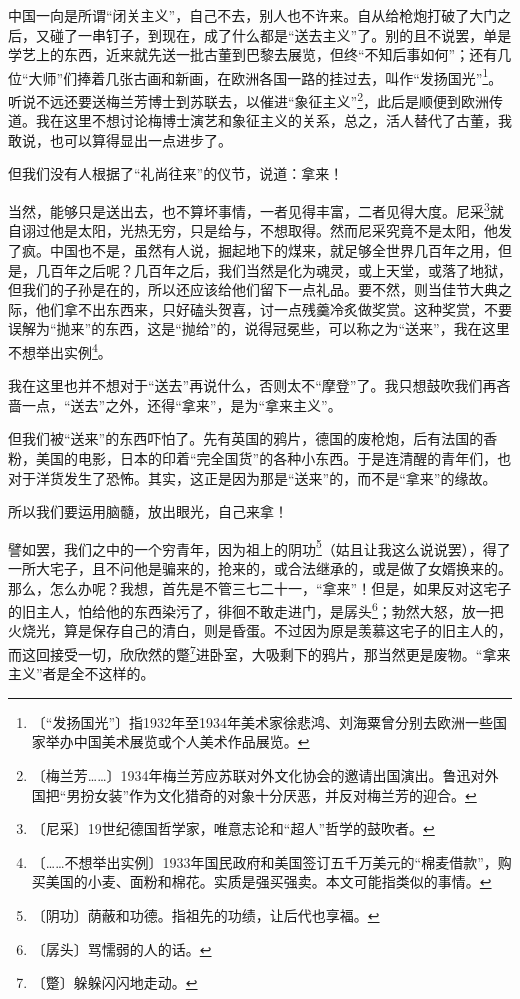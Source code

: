 \documentclass[12pt,UTF-8,openany]{ctexbook}
\begin{document}
\begin{large}
    
    中国一向是所谓“闭关主义”，自己不去，别人也不许来。自从给枪炮打破了大门之后，又碰了一串钉子，到现在，成了什么都是“送去主义”了。别的且不说罢，单是学艺上的东西，近来就先送一批古董到巴黎去展览，但终“不知后事如何”；还有几位“大师”们捧着几张古画和新画，在欧洲各国一路的挂过去，叫作“发扬国光”\footnote{〔“发扬国光”〕指1932年至1934年美术家徐悲鸿、刘海粟曾分别去欧洲一些国家举办中国美术展览或个人美术作品展览。}。听说不远还要送梅兰芳博士到苏联去，以催进“象征主义”\footnote{〔梅兰芳……〕1934年梅兰芳应苏联对外文化协会的邀请出国演出。鲁迅对外国把“男扮女装”作为文化猎奇的对象十分厌恶，并反对梅兰芳的迎合。}，此后是顺便到欧洲传道。我在这里不想讨论梅博士演艺和象征主义的关系，总之，活人替代了古董，我敢说，也可以算得显出一点进步了。
    
    但我们没有人根据了“礼尚往来”的仪节，说道：拿来！
    
    当然，能够只是送出去，也不算坏事情，一者见得丰富，二者见得大度。尼采\footnote{〔尼采〕19世纪德国哲学家，唯意志论和“超人”哲学的鼓吹者。}就自诩过他是太阳，光热无穷，只是给与，不想取得。然而尼采究竟不是太阳，他发了疯。中国也不是，虽然有人说，掘起地下的煤来，就足够全世界几百年之用，但是，几百年之后呢？几百年之后，我们当然是化为魂灵，或上天堂，或落了地狱，但我们的子孙是在的，所以还应该给他们留下一点礼品。要不然，则当佳节大典之际，他们拿不出东西来，只好磕头贺喜，讨一点残羹冷炙做奖赏。这种奖赏，不要误解为“抛来”的东西，这是“抛给”的，说得冠冕些，可以称之为“送来”，我在这里不想举出实例\footnote{〔……不想举出实例〕1933年国民政府和美国签订五千万美元的“棉麦借款”，购买美国的小麦、面粉和棉花。实质是强买强卖。本文可能指类似的事情。}。
    
    我在这里也并不想对于“送去”再说什么，否则太不“摩登”了。我只想鼓吹我们再吝啬一点，“送去”之外，还得“拿来”，是为“拿来主义”。
    
    但我们被“送来”的东西吓怕了。先有英国的鸦片，德国的废枪炮，后有法国的香粉，美国的电影，日本的印着“完全国货”的各种小东西。于是连清醒的青年们，也对于洋货发生了恐怖。其实，这正是因为那是“送来”的，而不是“拿来”的缘故。
    
    所以我们要运用脑髓，放出眼光，自己来拿！
    
    譬如罢，我们之中的一个穷青年，因为祖上的阴功\footnote{〔阴功〕荫蔽和功德。指祖先的功绩，让后代也享福。}（姑且让我这么说说罢），得了一所大宅子，且不问他是骗来的，抢来的，或合法继承的，或是做了女婿换来的。那么，怎么办呢？我想，首先是不管三七二十一，“拿来”！但是，如果反对这宅子的旧主人，怕给他的东西染污了，徘徊不敢走进门，是孱头\footnote{〔孱头〕骂懦弱的人的话。}；勃然大怒，放一把火烧光，算是保存自己的清白，则是昏蛋。不过因为原是羡慕这宅子的旧主人的，而这回接受一切，欣欣然的蹩\footnote{〔蹩〕躲躲闪闪地走动。}进卧室，大吸剩下的鸦片，那当然更是废物。“拿来主义”者是全不这样的。
    

\end{large}
\end{document}
